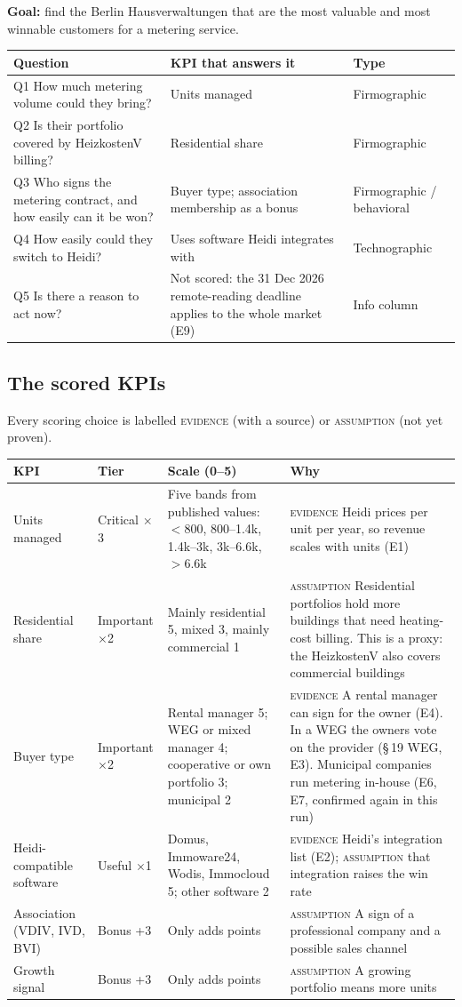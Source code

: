 \documentclass[11pt,a4paper]{article}
\newcommand{\ev}{\textcolor{accent}{\textsc{evidence}}}
\newcommand{\as}{\textcolor{assume}{\textsc{assumption}}}
\begin{document}
\textbf{Goal:} find the Berlin Hausverwaltungen that are the most valuable and most winnable
customers for a metering service.

\begin{tabularx}{\linewidth}{@{}L L l@{}}
\toprule
\textbf{Question} & \textbf{KPI that answers it} & \textbf{Type} \\
\midrule
Q1 How much metering volume could they bring? & Units managed & Firmographic \\
Q2 Is their portfolio covered by HeizkostenV billing? & Residential share & Firmographic \\
Q3 Who signs the metering contract, and how easily can it be won? & Buyer type; association
  membership as a bonus & Firmographic / behavioral \\
Q4 How easily could they switch to Heidi? & Uses software Heidi integrates with & Technographic \\
Q5 Is there a reason to act now? & Not scored: the 31 Dec 2026 remote-reading deadline applies to
  the whole market (E9) & Info column \\
\bottomrule
\end{tabularx}

\subsection{The scored KPIs}

Every scoring choice is labelled \ev{} (with a source) or \as{} (not yet proven).

\begin{tabularx}{\linewidth}{@{}p{2.6cm} p{1.9cm} L L@{}}
\toprule
\textbf{KPI} & \textbf{Tier} & \textbf{Scale (0--5)} & \textbf{Why} \\
\midrule
Units managed & Critical $\times$3 & Five bands from published values: $<$800, 800--1.4k,
  1.4k--3k, 3k--6.6k, $>$6.6k & \ev{} Heidi prices per unit per year, so revenue scales with
  units (E1) \\
Residential share & Important $\times$2 & Mainly residential 5, mixed 3, mainly commercial 1 &
  \as{} Residential portfolios hold more buildings that need heating-cost billing. This is a
  proxy: the HeizkostenV also covers commercial buildings \\
Buyer type & Important $\times$2 & Rental manager 5; WEG or mixed manager 4; cooperative or own
  portfolio 3; municipal 2 & \ev{} A rental manager can sign for the owner (E4). In a WEG the
  owners vote on the provider (\S\,19 WEG, E3). Municipal companies run metering in-house
  (E6, E7, confirmed again in this run) \\
Heidi-compatible software & Useful $\times$1 & Domus, Immoware24, Wodis, Immocloud 5; other
  software 2 & \ev{} Heidi's integration list (E2); \as{} that integration raises the win rate \\
Association (VDIV, IVD, BVI) & Bonus +3 & Only adds points & \as{} A sign of a professional
  company and a possible sales channel \\
Growth signal & Bonus +3 & Only adds points & \as{} A growing portfolio means more units \\
\bottomrule
\end{tabularx}
\end{document}
